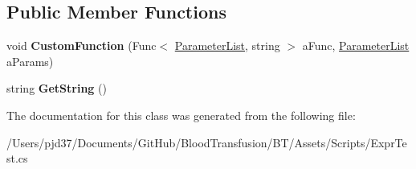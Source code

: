 \subsection*{Public Member Functions}
\begin{DoxyCompactItemize}
\item 
void {\bfseries Custom\+Function} (Func$<$ \hyperlink{class_b83_1_1_logic_expression_parser_1_1_parameter_list}{Parameter\+List}, string $>$ a\+Func, \hyperlink{class_b83_1_1_logic_expression_parser_1_1_parameter_list}{Parameter\+List} a\+Params)\hypertarget{class_b83_1_1_logic_expression_parser_1_1_custom_string_function_ad0e16499b68791f36429fd99b370251f}{}\label{class_b83_1_1_logic_expression_parser_1_1_custom_string_function_ad0e16499b68791f36429fd99b370251f}

\item 
string {\bfseries Get\+String} ()\hypertarget{class_b83_1_1_logic_expression_parser_1_1_custom_string_function_a4bd29c84c65faec0a3cb415a3ca3e06a}{}\label{class_b83_1_1_logic_expression_parser_1_1_custom_string_function_a4bd29c84c65faec0a3cb415a3ca3e06a}

\end{DoxyCompactItemize}


The documentation for this class was generated from the following file\+:\begin{DoxyCompactItemize}
\item 
/\+Users/pjd37/\+Documents/\+Git\+Hub/\+Blood\+Transfusion/\+B\+T/\+Assets/\+Scripts/Expr\+Test.\+cs\end{DoxyCompactItemize}
